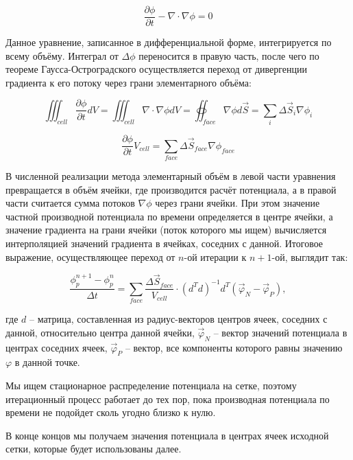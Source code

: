 \documentclass[a4paper,12pt]{article}
\begin{document}
\begin{equation}
    \frac{\partial \phi}{\partial t} - \nabla \cdot \nabla \phi = 0
\end{equation}

Данное уравнение, записанное в дифференциальной форме, интегрируется по всему объёму. Интеграл от $\Delta \phi$ переносится в правую часть, после чего по теореме Гаусса-Остроградского осуществляется переход от дивергенции градиента к его потоку через грани элементарного объёма:

\begin{equation}
    \iiint_{cell} \frac{\partial \phi}{\partial t} dV = \iiint_{cell} \nabla \cdot \nabla \phi dV = \oiint_{face} \nabla \phi d \vec S = \sum_i \Delta \vec S_i \nabla \phi_i
\end{equation}

\begin{equation}
    \frac{\partial \phi}{\partial t} V_{cell} = \sum_{face} \Delta \vec S_{face} \nabla \phi_{face}
\end{equation}

В численной реализации метода элементарный объём в левой части уравнения превращается в объём ячейки, где производится расчёт потенциала, а в правой части считается сумма потоков $\nabla \phi$ через грани ячейки. При этом значение частной производной потенциала по времени определяется в центре ячейки, а значение градиента на грани ячейки (поток которого мы ищем) вычисляется интерполяцией значений градиента в ячейках, соседних с данной.
Итоговое выражение, осуществляющее переход от $n$-ой итерации к $n+1$-ой, выглядит так:

\begin{equation}
    \frac{\phi_{p}^{n+1} - \phi_{p}^{n}}{\Delta t} = \sum_{face} \frac{\Delta \vec S_{face}}{V_{cell}} \cdot (d^T d)^{-1} d^T (\vec{\varphi}_N - \vec{\varphi}_P),
\end{equation}

\noindent
где $d$ -- матрица, составленная из радиус-векторов центров ячеек, соседних с данной, относительно центра данной ячейки, $\vec{\varphi}_N$ -- вектор значений потенциала в центрах соседних ячеек, $\vec{\varphi}_P$ -- вектор, все компоненты которого равны значению $\varphi$ в данной точке.

Мы ищем стационарное распределение потенциала на сетке, поэтому итерационный процесс работает до тех пор, пока производная потенциала по времени не подойдет сколь угодно близко к нулю.

В конце концов мы получаем значения потенциала в центрах ячеек исходной сетки, которые будет использованы далее.
\end{document}
